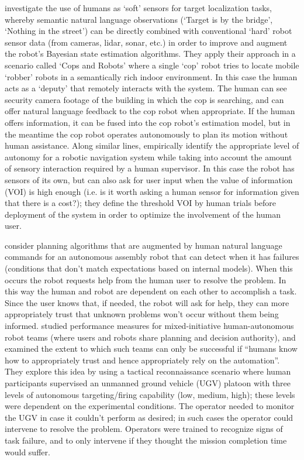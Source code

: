 \citet{Sweet2016-dw} investigate the use of  humans as `soft' sensors for target localization tasks, whereby semantic natural language observations (`Target is by the bridge', `Nothing in the street') can be directly combined with conventional `hard' robot sensor data (from cameras, lidar, sonar, etc.) in order to improve and augment the robot's Bayesian state estimation algorithms. 
They apply their approach in a scenario called `Cops and Robots' where a single `cop' robot tries to locate mobile `robber' robots in a semantically rich indoor environment. 
In this case the human acts as a `deputy' that remotely interacts with the system. The human can see security camera footage of the building in which the cop is searching, and can offer natural language feedback to the cop robot when appropriate. If the human offers information, it can be fused into the cop robot's estimation model, but in the meantime the cop robot operates autonomously to plan its motion without human assistance. 
Along similar lines, \citet{Kaupp2008-yr} empirically identify the appropriate level of autonomy for a robotic navigation system while taking into account the amount of sensory interaction required by a human supervisor. In this case the robot has sensors of its own, but can also ask for user input when the value of information (VOI) is high enough (i.e. is it worth asking a human sensor for information given that there is a cost?); they define the threshold VOI by human trials before deployment of the system in order to optimize the involvement of the human user.

\citet{Tellex2014-uc} consider planning algorithms that are augmented by human natural language commands for an autonomous assembly robot that can detect when it has failures (conditions that don't match expectations based on internal models). When this occurs the robot requests help from the human user to resolve the problem. In this way the human and robot are dependent on each other to accomplish a task. Since the user knows that, if needed, the robot will ask for help, they can more appropriately trust that unknown problems won't occur without them being informed.
\citet{Freedy2007-sg} studied performance measures for  mixed-initiative human-autonomous robot teams (where users and robots share planning and decision authority), and examined the extent to which such teams can only be successful if ``humans know how to appropriately trust and hence appropriately rely on the automation''. They explore this idea by using a tactical reconnaissance scenario where human participants supervised an unmanned ground vehicle (UGV)  platoon with three levels of autonomous targeting/firing capability (low, medium, high); these levels were dependent on the experimental conditions. The operator needed to monitor the UGV in case it couldn't perform as desired; in such cases the operator could intervene to resolve the problem. Operators were trained to recognize signs of task failure, and to only intervene if they thought the mission completion time would suffer. 

